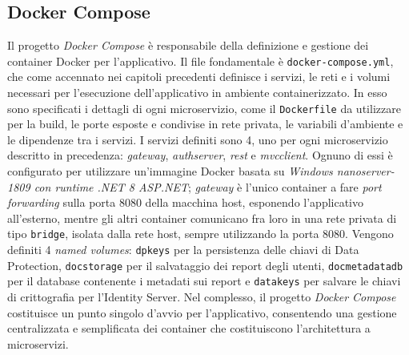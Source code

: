 \subsection{Docker Compose}
Il progetto \emph{Docker Compose} è responsabile della definizione e gestione dei container Docker per l'applicativo.
Il file fondamentale è \texttt{docker-compose.yml}, che come accennato nei capitoli precedenti definisce i servizi, le reti e i volumi necessari per l'esecuzione dell'applicativo in ambiente containerizzato. In esso sono specificati i dettagli di ogni microservizio, come il \texttt{Dockerfile} da utilizzare per la build, le porte esposte e condivise in rete privata, le variabili d'ambiente e le dipendenze tra i servizi.
I servizi definiti sono 4, uno per ogni microservizio descritto in precedenza: \emph{gateway}, \emph{authserver}, \emph{rest} e \emph{mvcclient}.
Ognuno di essi è configurato per utilizzare un'immagine Docker basata su \emph{Windows nanoserver-1809 con runtime .NET 8 ASP.NET}; \emph{gateway} è l'unico container a fare \emph{port forwarding} sulla porta 8080 della macchina host, esponendo l'applicativo all'esterno, mentre gli altri container comunicano fra loro in una rete privata di tipo \texttt{bridge}, isolata dalla rete host, sempre utilizzando la porta 8080.
Vengono definiti 4 \emph{named volumes}: \texttt{dpkeys} per la persistenza delle chiavi di Data Protection, \texttt{docstorage} per il salvataggio dei report degli utenti, \texttt{docmetadatadb} per il database contenente i metadati sui report e \texttt{datakeys} per salvare le chiavi di crittografia per l'Identity Server.
Nel complesso, il progetto \emph{Docker Compose} costituisce un punto singolo d'avvio per l'applicativo, consentendo una gestione centralizzata e semplificata dei container che costituiscono l'architettura a microservizi.